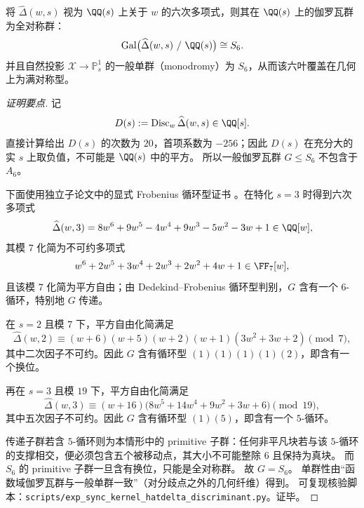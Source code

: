 \begin{proposition}\label{prop:sync-hatdelta-galois-s6-generic}
将 \(\widehat\Delta(w,s)\) 视为 \(\QQ(s)\) 上关于 \(w\) 的六次多项式，则其在 \(\QQ(s)\) 上的伽罗瓦群为全对称群：
\[
\mathrm{Gal}\bigl(\widehat\Delta(w,s)\ /\ \QQ(s)\bigr)\cong S_6.
\]
并且自然投影 \(\mathcal{X}\to\mathbb{P}^1_s\) 的一般单群（monodromy）为 \(S_6\)，从而该六叶覆盖在几何上为满对称型。
\end{proposition}
\begin{proof}[证明要点]
记
\[
D(s):=\operatorname{Disc}_w\widehat\Delta(w,s)\in\QQ[s].
\]
直接计算给出 \(D(s)\) 的次数为 \(20\)，首项系数为 \(-256\)；因此
\(D(s)\) 在充分大的实 \(s\) 上取负值，不可能是 \(\QQ(s)\) 中的平方。
所以一般伽罗瓦群 \(G\le S_6\) 不包含于 \(A_6\)。
\par
下面使用独立子论文中的显式 Frobenius 循环型证书
\cite{Internal2026SelfDualSynchronisationKernelCyclotomicTwists}。在特化 \(s=3\) 时得到六次多项式
\[
\widehat\Delta(w,3)=8w^6+9w^5-4w^4+9w^3-5w^2-3w+1\in\QQ[w],
\]
其模 \(7\) 化简为不可约多项式
\[
w^6+2w^5+3w^4+2w^3+2w^2+4w+1\in\FF_7[w],
\]
且该模 \(7\) 化简为平方自由；由 Dedekind--Frobenius 循环型判别，\(G\)
含有一个 \(6\)-循环，特别地 \(G\) 传递。
\par
在 \(s=2\) 且模 \(7\) 下，平方自由化简满足
\[
\widehat\Delta(w,2)\equiv
(w+6)(w+5)(w+2)(w+1)(3w^2+3w+2)\pmod 7,
\]
其中二次因子不可约。因此 \(G\) 含有循环型 \((1)(1)(1)(1)(2)\)，即含有一个换位。
\par
再在 \(s=3\) 且模 \(19\) 下，平方自由化简满足
\[
\widehat\Delta(w,3)\equiv
(w+16)\bigl(8w^5+14w^4+9w^2+3w+6\bigr)\pmod{19},
\]
其中五次因子不可约。因此 \(G\) 含有循环型 \((1)(5)\)，即含有一个 \(5\)-循环。
\par
传递子群若含 \(5\)-循环则为本情形中的 primitive 子群：任何非平凡块若与该
\(5\)-循环的支撑相交，便必须包含五个被移动点，其大小不可能整除 \(6\) 且保持为真块。
而 \(S_6\) 的 primitive 子群一旦含有换位，只能是全对称群。
故 \(G=S_6\)。
单群性由“函数域伽罗瓦群与一般单群一致”（对分歧点之外的几何纤维）得到。
可复现核验脚本：\texttt{scripts/exp\_sync\_kernel\_hatdelta\_discriminant.py}。证毕。
\end{proof}


